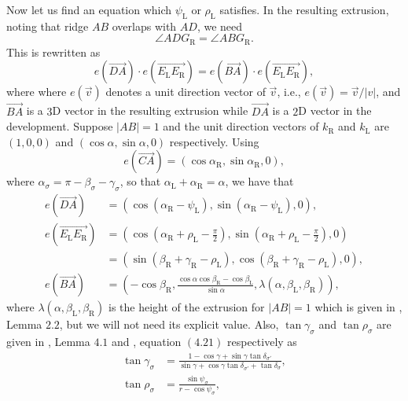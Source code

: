 \documentclass[11pt]{amsart}
\numberwithin{equation}{section}
\numberwithin{theorem}{section}
\newcommand{\Lt}{\ensuremath{\mathrm{L}}}
\newcommand{\Rt}{\ensuremath{\mathrm{R}}}
\newcommand{\norm}[1]{\ensuremath{\left| #1 \right|}}
\newcommand{\ora}[1]{\ensuremath{\overrightarrow{#1}}}
\begin{document}
Now let us find an equation which $\psi_\Lt$ or $\rho_\Lt$ satisfies.
In the resulting extrusion, noting that ridge $AB$ overlaps with $AD$, we need
\begin{equation}\label{eq:ADG=ABG}
\angle ADG_\Rt =\angle ABG_\Rt .
\end{equation}
This is rewritten as
\begin{equation}\label{eq:DA_EE=BA_EE}
e(\ora{DA})\cdot e(\ora{E_\Lt E_\Rt})=e(\ora{BA})\cdot e(\ora{E_\Lt E_\Rt}),
\end{equation}
where where $e(\ora{v})$ denotes a unit direction vector of $\ora{v}$, i.e., $e(\ora{v})=\ora{v}/\norm{v}$, and
$\ora{BA}$ is a $3$D vector in the resulting extrusion while $\ora{DA}$ is a $2$D vector in the development.
Suppose $\norm{AB}=1$ and the unit direction vectors of $k_\Rt$ and $k_\Lt$ are $(1,0,0)$ and $(\cos\alpha ,\sin\alpha ,0)$ respectively.
Using
\begin{equation*}
e(\ora{CA})=(\cos\alpha_\Rt ,\sin\alpha_\Rt ,0),
\end{equation*}
where $\alpha_\sigma =\pi -\beta_\sigma -\gamma_\sigma$, so that $\alpha_\Lt +\alpha_\Rt =\alpha$, we have that
\begin{align*}
e(\ora{DA})&=(\cos (\alpha_\Rt -\psi_\Lt ),\sin (\alpha_\Rt -\psi_\Lt ),0),\\
e(\ora{E_\Lt E_\Rt})&=\left(\cos\left(\alpha_\Rt +\rho_\Lt -\frac{\pi}{2}\right) ,\sin\left(\alpha_\Rt +\rho_\Lt -\frac{\pi}{2}\right),0\right)\\
&=(\sin (\beta_\Rt +\gamma_\Rt -\rho_\Lt ) ,\cos (\beta_\Rt +\gamma_\Rt -\rho_\Lt ) ,0) ,\\
e(\ora{BA})&=\left(-\cos\beta_\Rt ,\frac{\cos\alpha\cos\beta_\Rt -\cos\beta_\Lt}{\sin\alpha},\lambda (\alpha ,\beta_\Lt ,\beta_\Rt )\right) ,
\end{align*}
where $\lambda (\alpha ,\beta_\Lt ,\beta_\Rt )$ is the height of the extrusion for $\norm{AB}=1$
which is given in \cite{Doi19}, Lemma $2.2$, but we will not need its explicit value.
Also, $\tan\gamma_\sigma$ and $\tan\rho_\sigma$ are given in \cite{Doi19}, Lemma $4.1$ and \cite{Doi20}, equation $(4.21)$ respectively as
\begin{equation}
\begin{aligned}\label{eq:gamma_rho}
\tan\gamma_\sigma&=\frac{1-\cos\gamma +\sin\gamma\tan\delta_{\sigma'}}{\sin\gamma +\cos\gamma\tan\delta_{\sigma'}+\tan\delta_\sigma},\\
\tan\rho_\sigma&=\frac{\sin\psi_\sigma}{r-\cos\psi_\sigma},
\end{aligned}
\end{equation}
\end{document}
